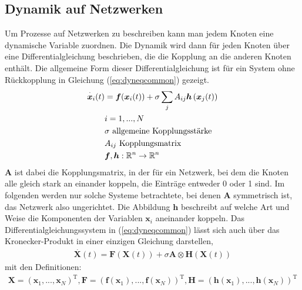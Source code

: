 \subsection*{Dynamik auf Netzwerken}
Um Prozesse auf Netzwerken zu beschreiben kann man jedem Knoten eine dynamische Variable zuordnen. Die Dynamik wird dann für jeden Knoten über eine Differentialgleichung beschrieben, die die Kopplung an die anderen Knoten enthält. Die allgemeine Form dieser Differentialgleichung ist für ein System ohne Rückkopplung in Gleichung (\ref*{eq:dyneqcommon}) gezeigt.
\begin{align}\label{eq:dyneqcommon}
\overset{\cdot}{\boldsymbol{x}}_i(t)&=\boldsymbol{f}(\boldsymbol{x}_i(t))+\sigma\sum_j A_{ij}\boldsymbol{h}\left(\boldsymbol{x}_j(t)\right)
\\\notag & i=1,...,N
\\\notag & \sigma \text{ allgemeine Kopplungsstärke}
\\\notag & A_{ij}\text{ Kopplungsmatrix}
\\\notag & \boldsymbol{f},\boldsymbol{h}:\mathbb{R}^n\rightarrow\mathbb{R}^n
\end{align}
$\boldsymbol{A}$ ist dabei die Kopplungsmatrix, in der für ein Netzwerk, bei dem die Knoten alle gleich stark an einander koppeln, die Einträge entweder 0 oder 1 sind. Im folgenden werden nur solche Systeme betrachtete, bei denen $\boldsymbol{A}$ symmetrisch ist, das Netzwerk also ungerichtet. Die Abbildung $\boldsymbol{h}$ beschreibt auf welche Art und Weise die Komponenten der Variablen $\boldsymbol{x}_i$ aneinander koppeln. Das Differentialgleichungssystem in (\ref*{eq:dyneqcommon}) lässt sich auch über das Kronecker-Produkt in einer einzigen Gleichung darstellen,
\begin{align}
\overset{\cdot}{\boldsymbol{X}}(t)=\boldsymbol{F}(\boldsymbol{X}(t))+\sigma\boldsymbol{A}\otimes\boldsymbol{H}(\boldsymbol{X}(t))
\end{align}
mit den Definitionen:
\begin{align*}
\boldsymbol{X}=\left(\boldsymbol{x}_1,...,\boldsymbol{x}_N\right)^{\text{T}},
\boldsymbol{F}=\left(\boldsymbol{f}(\boldsymbol{x}_1),...,\boldsymbol{f}(\boldsymbol{x}_N)\right)^{\text{T}},
\boldsymbol{H}=\left(\boldsymbol{h}(\boldsymbol{x}_1),...,\boldsymbol{h}(\boldsymbol{x}_N)\right)^{\text{T}}
\end{align*}

